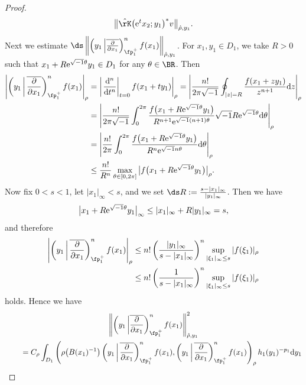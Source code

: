 \begin{proof}
\begin{gather*}
\big\Vert\hat{\rK}\big({\rm e}^tx_2;y_1\big)^*v\big\Vert_{\hat{\rho},y_1}.
\end{gather*}
Next we estimate
$\ds \left\Vert\left(y_1\,\middle|\overline{\frac{\partial}{\partial x_1}}\right)_{\fp^+_1}^nf(x_1)\right\Vert_{\hat{\rho},y_1}$.
For $x_1,y_1\in D_1$, we take $R>0$ such that $x_1+R{\rm e}^{\sqrt{-1}\theta}y_1\in D_1$ for any $\theta\in\BR$. Then
\begin{align*}
\left|\left(y_1\,\middle|\,\overline{\frac{\partial}{\partial x_1}}\right)_{\fp^+_1}^nf(x_1)\right|_\rho
&=\left|\left.\frac{{\rm d}^n}{{\rm d}t^n}\right|_{t=0}f(x_1+ty_1)\right|_\rho
=\left|\frac{n!}{2\pi\sqrt{-1}}\oint_{|z|=R}\frac{f(x_1+zy_1)}{z^{n+1}}{\rm d}z\right|_\rho \\
&=\left|\frac{n!}{2\pi\sqrt{-1}}\int_0^{2\pi}\frac{f\big(x_1+R{\rm e}^{\sqrt{-1}\theta}y_1\big)}{R^{n+1}{\rm e}^{\sqrt{-1}(n+1)\theta}}
\sqrt{-1}R{\rm e}^{\sqrt{-1}\theta}{\rm d}\theta\right|_\rho \\
&=\left|\frac{n!}{2\pi}\int_0^{2\pi}\frac{f\big(x_1+R{\rm e}^{\sqrt{-1}\theta}y_1\big)}{R^n{\rm e}^{\sqrt{-1}n\theta}}{\rm d}\theta\right|_\rho\\
& \le \frac{n!}{R^n}\max_{\theta\in[0,2\pi]}\big|f\big(x_1+R{\rm e}^{\sqrt{-1}\theta}y_1\big)\big|_\rho.
\end{align*}
Now fix $0<s<1$, let $|x_1|_\infty<s$, and we set $\ds R:=\frac{s-|x_1|_\infty}{|y_1|_\infty}$. Then we have
\begin{gather*} \big|x_1+R{\rm e}^{\sqrt{-1}\theta}y_1\big|_\infty\le |x_1|_\infty+R|y_1|_\infty=s, \end{gather*}
and therefore
\begin{align*}
\left|\left(y_1\,\middle|\,\overline{\frac{\partial}{\partial x_1}}\right)_{\fp^+_1}^nf(x_1)\right|_\rho
&\le n!\left(\frac{|y_1|_\infty}{s-|x_1|_\infty}\right)^n\sup_{|\xi_1|_\infty\le s}|f(\xi_1)|_\rho \\
&\le n!\left(\frac{1}{s-|x_1|_\infty}\right)^n\sup_{|\xi_1|_\infty\le s}|f(\xi_1)|_\rho
\end{align*}
holds. Hence we have
\begin{gather}
 \left\Vert\left(y_1\,\middle|\overline{\frac{\partial}{\partial x_1}}\right)_{\fp^+_1}^nf(x_1)\right\Vert_{\hat{\rho},y_1}^2 \notag \\
\qquad{} =C_\rho\int_{D_1} \left(\rho\big(B(x_1)^{-1}\big)\left(y_1\,\middle|\,\overline{\frac{\partial}{\partial x_1}}\right)_{\fp^+_1}^nf(x_1)
,\left(y_1\,\middle|\,\overline{\frac{\partial}{\partial x_1}}\right)_{\fp^+_1}^nf(x_1)\right)_\rho h_1(y_1)^{-p_1}{\rm d}y_1 \notag \\

\end{gather}
\end{proof}
